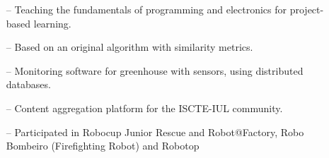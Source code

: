 \documentclass[10pt,a4paper]{altacv}
\begin{document}

\begin{itemize}
    \setlength{\itemindent}{0.5em}
    \item[--]   \small{Teaching the fundamentals of programming and electronics for project-based learning.}
\end{itemize}
\medskip









\begin{itemize}
  \setlength{\itemindent}{0.5em}
    \item[--]   \small{Based on an original algorithm with similarity metrics.}
\end{itemize}


\begin{itemize}
  \setlength{\itemindent}{0.5em}
    \item[--]   \small{Monitoring software for greenhouse with sensors, using distributed databases.}
\end{itemize}


\begin{itemize}
  \setlength{\itemindent}{0.5em}
    \item[--]   \small{Content aggregation platform for the ISCTE-IUL community. }
\end{itemize}





\begin{itemize}
\setlength{\itemindent}{0.5em}
  \item[--]   \small{Participated in Robocup Junior Rescue and Robot@Factory, Robo Bombeiro (Firefighting Robot) and  Robotop}
\end{itemize}
\end{document}
